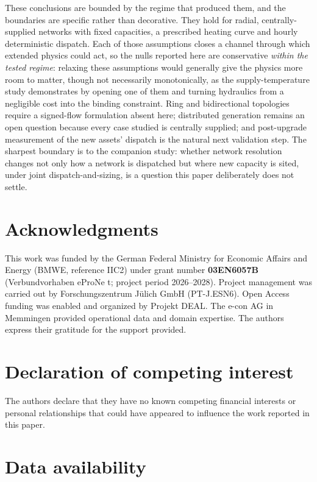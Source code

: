 \documentclass[a4paper,fleqn]{cas-sc}
\providecommand{\DIFadd}[1]{{\protect\color[HTML]{1A5FB4} #1}} %
\providecommand{\DIFaddbegin}{} %
\providecommand{\DIFaddend}{} %
\newcommand{\DIFaddincludegraphics}[2][]{{\color{blue}\fbox{\DIFOincludegraphics[#1]{#2}}}} %
\DeclareRobustCommand{\DIFaddbegin}{\DIFOaddbegin \let\includegraphics\DIFaddincludegraphics} %
\DeclareRobustCommand{\DIFaddend}{\DIFOaddend \let\includegraphics\DIFOincludegraphics} %
\begin{document}
These conclusions are bounded by the regime that produced them, and the boundaries are
specific rather than decorative. They hold for radial, centrally-supplied networks with
fixed capacities, a prescribed heating curve and hourly deterministic dispatch. Each of
those assumptions closes a channel through which extended physics could act, so the nulls
reported here are conservative \emph{within the tested regime}: relaxing these assumptions would
generally give the physics more room to matter, though not necessarily monotonically, as the
supply-temperature study demonstrates by opening one of
them and turning hydraulics from a negligible cost into the binding constraint. Ring and
bidirectional topologies require a signed-flow formulation absent here; distributed
generation remains an open question because every case studied is centrally supplied; and
post-upgrade measurement of the new assets' dispatch is the natural next validation step.
The sharpest boundary is to the companion study: whether network resolution changes not only
how a network is dispatched but where new capacity is sited, under joint
dispatch-and-sizing, is a question this paper deliberately does not settle.

\section*{Acknowledgments}

This work was funded by the German Federal Ministry for Economic Affairs and Energy
(BMWE, reference IIC2) under grant number \textbf{03EN6057B} (Verbundvorhaben eProNe\DIFaddbegin \DIFadd{t}\DIFaddend;
project period 2026--2028). Project management was carried out by Forschungszentrum
J\"ulich GmbH (PT-J.ESN6). Open Access funding was enabled and organized by Projekt DEAL.
The e-con AG in Memmingen provided operational data and domain expertise. The authors
express their gratitude for the support provided.

\section*{Declaration of competing interest}

The authors declare that they have no known competing financial interests or personal
relationships that could have appeared to influence the work reported in this paper.

\section*{Data availability}
\end{document}
